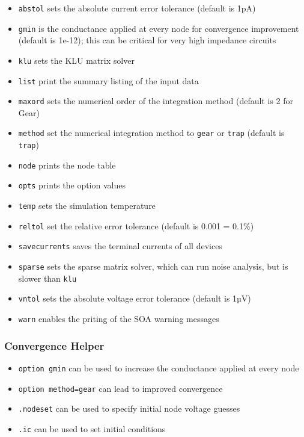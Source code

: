 \documentclass[
  a4paper,
  DIV=11,
  numbers=noendperiod]{scrartcl}
\providecommand{\tightlist}{%
  \setlength{\itemsep}{0pt}\setlength{\parskip}{0pt}}\usepackage{longtable,booktabs,array}
\begin{document}
\begin{itemize}
\tightlist
\item
  \texttt{abstol} sets the absolute current error tolerance (default is
  1pA)
\item
  \texttt{gmin} is the conductance applied at every node for convergence
  improvement (default is 1e-12); this can be critical for very high
  impedance circuits
\item
  \texttt{klu} sets the KLU matrix solver
\item
  \texttt{list} print the summary listing of the input data
\item
  \texttt{maxord} sets the numerical order of the integration method
  (default is 2 for Gear)
\item
  \texttt{method} set the numerical integration method to \texttt{gear}
  or \texttt{trap} (default is \texttt{trap})
\item
  \texttt{node} prints the node table
\item
  \texttt{opts} prints the option values
\item
  \texttt{temp} sets the simulation temperature
\item
  \texttt{reltol} set the relative error tolerance (default is 0.001 =
  0.1\%)
\item
  \texttt{savecurrents} saves the terminal currents of all devices
\item
  \texttt{sparse} sets the sparse matrix solver, which can run noise
  analysis, but is slower than \texttt{klu}
\item
  \texttt{vntol} sets the absolute voltage error tolerance (default is
  1µV)
\item
  \texttt{warn} enables the priting of the SOA warning messages
\end{itemize}

\subsubsection{Convergence Helper}\label{convergence-helper}

\begin{itemize}
\tightlist
\item
  \texttt{option\ gmin} can be used to increase the conductance applied
  at every node
\item
  \texttt{option\ method=gear} can lead to improved convergence
\item
  \texttt{.nodeset} can be used to specify initial node voltage guesses
\item
  \texttt{.ic} can be used to set initial conditions
\end{itemize}
\end{document}
